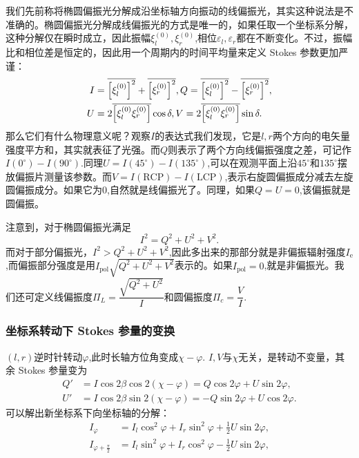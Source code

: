 \documentclass[../天体物理基础.tex]{subfiles}
\begin{document}
我们先前称将椭圆偏振光分解成沿坐标轴方向振动的线偏振光，其实这种说法是不准确的。椭圆偏振光分解成线偏振光的方式是唯一的，如果任取一个坐标系分解，这种分解仅在瞬时成立，因此振幅$\xi_{l}^{\left(0\right)},\xi_{r}^{\left(0\right)}$,相位$\varepsilon_{l},\varepsilon_{r}$都在不断变化。不过，振幅比和相位差是恒定的，因此用一个周期内的时间平均量来定义 Stokes 参数更加严谨：
\begin{align}
I&=\overline{\left[\xi_l^{\left(0\right)}\right]^2}+\overline{\left[\xi_r^{\left(0\right)}\right]^2},Q=\overline{\left[\xi_l^{\left(0\right)}\right]^2}-\overline{\left[\xi_r^{\left(0\right)}\right]^2},\notag\\
U&=2\overline{\left[\xi_l^{\left(0\right)}\xi_r^{\left(0\right)}\right]}\cos\delta,V=2\overline{\left[\xi_l^{\left(0\right)}\xi_r^{\left(0\right)}\right]}\sin\delta.\notag
\end{align}
那么它们有什么物理意义呢？观察$I$的表达式我们发现，它是$l,r$两个方向的电矢量强度平方和，其实就表征了光强。而$Q$则表示了两个方向线偏振强度之差，可记作$I\left(0^{\circ}\right)-I\left(90^{\circ}\right)$.同理$U=I\left(45^{\circ}\right)-I\left(135^{\circ}\right)$,可以在观测平面上沿$45^{\circ}$和$135^{\circ}$摆放偏振片测量该参数。而$V=I\left(\text{RCP}\right)-I\left(\text{LCP}\right)$,表示右旋圆偏振成分减去左旋圆偏振成分。如果它为$0$,自然就是线偏振光了。同理，如果$Q=U=0$,该偏振就是圆偏振。

注意到，对于椭圆偏振光满足
\begin{equation}
I^2=Q^2+U^2+V^2.
\end{equation}
而对于部分偏振光，$I^{2}>Q^{2}+U^{2}+V^{2}$,因此多出来的那部分就是非偏振辐射强度$I_{\text{e}}$,而偏振部分强度是用$I_{\text{pol}}\sqrt{Q^{2}+U^{2}+V^{2}}$表示的。如果$I_{\text{pol}}=0$,就是非偏振光。我们还可定义线偏振度$\Pi_L=\dfrac{\sqrt{Q^2+U^2}}{I}$和圆偏振度$\Pi_c=\dfrac{V}{I}$.

\subsubsection{坐标系转动下 Stokes 参量的变换}
$(l,r)$逆时针转动$\varphi$,此时长轴方位角变成$\chi-\varphi$. $I,V$与$\chi$无关，是转动不变量，其余 Stokes 参量变为
\begin{align}
Q'&=I\cos2\beta\cos2\left(\chi-\varphi\right)=Q\cos2\varphi+U\sin2\varphi,\\
U'&=I\cos2\beta\sin2\left(\chi-\varphi\right)=-Q\sin2\varphi+U\cos2\varphi.
\end{align}
可以解出新坐标系下向坐标轴的分解：
\begin{align}
I_\varphi&=I_l\cos^2\varphi+I_r\sin^2\varphi+\frac12U\sin2\varphi,\\
I_{\varphi+\frac\pi2}&=I_l\sin^2\varphi+I_r\cos^2\varphi-\frac12U\sin2\varphi,
\end{align}
\end{document}
